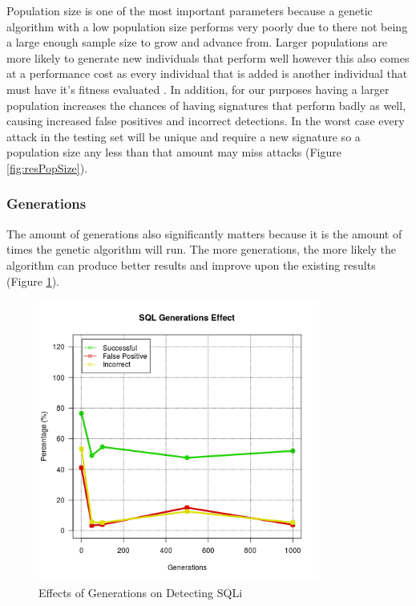 Population size is one of the most important parameters because a genetic algorithm with a low population size performs very poorly due to there not being a large enough sample size to grow and advance from.  Larger populations are more likely to generate new individuals that perform well however this also comes at a performance cost as every individual that is added is another individual that must have it's fitness evaluated \cite{optimizationOfControlParameters}.  In addition, for our purposes having a larger population increases the chances of having signatures that perform badly as well, causing increased false positives and incorrect detections.  In the worst case every attack in the testing set will be unique and require a new signature so a population size any less than that amount may miss attacks (Figure \ref{fig:resPopSize}).

\subsubsection{Generations} \label{sec:resGeneration}

The amount of generations also significantly matters because it is the amount of times the genetic algorithm will run.  The more generations, the more likely the algorithm can produce better results and improve upon the existing results (Figure \ref{fig:resGenerations}).

\begin{figure}[hb]
	\centering
	\includegraphics[width=350px]{./assets/results/ga/generations/Results_SQL.png}
	\caption{Effects of Generations on Detecting SQLi}
	\label{fig:resGenerations}
\end{figure}

